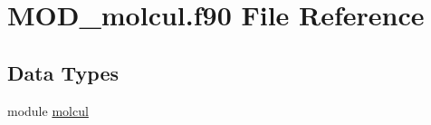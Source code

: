 \hypertarget{MOD__molcul_8f90}{\section{M\-O\-D\-\_\-molcul.\-f90 File Reference}
\label{MOD__molcul_8f90}
}
\subsection*{Data Types}
\begin{DoxyCompactItemize}
\item 
module \hyperlink{classmolcul}{molcul}
\end{DoxyCompactItemize}
